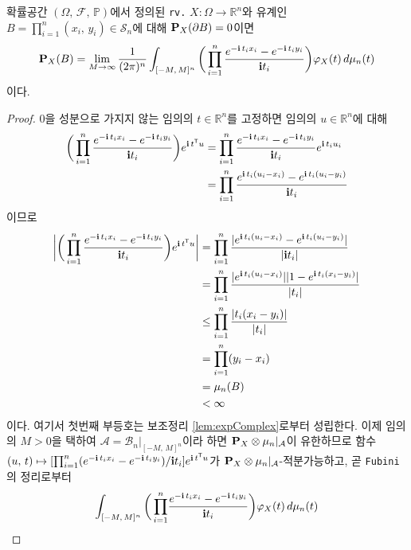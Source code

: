 \begin{theorem}
    확률공간 $(\Omega,\,\mathcal{F},\,\mathbb{P})$에서 정의된 \texttt{rv.} $X:\Omega\to\mathbb{R}^n$와 유계인 $B=\prod_{i=1}^n(x_i,\,y_i)\in\mathcal{S}_n$에 대해 $\mathbf{P}_X(\partial B)=0$이면
    \begin{equation*}
        \mathbf{P}_X(B)=\lim_{M\to\infty}\frac{1}{(2\pi)^n}\int_{[-M,\,M]^n}\bigg(\prod_{i=1}^n\frac{e^{-\mathbf{i}\,t_ix_i}-e^{-\mathbf{i}\,t_iy_i}}{\mathbf{i} t_i}\bigg)\varphi_X(t)\,d\mu_n(t)
    \end{equation*}
    이다.
\end{theorem}

\begin{proof}
    $0$을 성분으로 가지지 않는 임의의 $t\in\mathbb{R}^n$를 고정하면 임의의 $u\in\mathbb{R}^n$에 대해
    \begin{align*}
        \bigg(\prod_{i=1}^n\frac{e^{-\mathbf{i}\,t_ix_i}-e^{-\mathbf{i}\,t_iy_i}}{\mathbf{i} t_i}\bigg)e^{\mathbf{i}\,t^{\mathsf{T}} u}&=\prod_{i=1}^n\frac{e^{-\mathbf{i}\,t_ix_i}-e^{-\mathbf{i}\,t_iy_i}}{\mathbf{i} t_i}e^{\mathbf{i}\,t_iu_i}\\
        &=\prod_{i=1}^n\frac{e^{\mathbf{i}\,t_i(u_i-x_i)}-e^{\mathbf{i}\,t_i(u_i-y_i)}}{\mathbf{i} t_i}
    \end{align*}
    이므로
    \begin{align*}
        \bigg|\bigg(\prod_{i=1}^n\frac{e^{-\mathbf{i}\,t_ix_i}-e^{-\mathbf{i}\,t_iy_i}}{\mathbf{i} t_i}\bigg)e^{\mathbf{i}\,t^{\mathsf{T}} u}\bigg|&=\prod_{i=1}^n\frac{|e^{\mathbf{i}\,t_i(u_i-x_i)}-e^{\mathbf{i}\,t_i(u_i-y_i)}|}{|\mathbf{i} t_i|}\\
        &=\prod_{i=1}^n\frac{|e^{\mathbf{i}\,t_i(u_i-x_i)}||1-e^{\mathbf{i}\,t_i(x_i-y_i)}|}{|t_i|}\\
        &\leq\prod_{i=1}^n\frac{|t_i(x_i-y_i)|}{|t_i|}\\
        &=\prod_{i=1}^n(y_i-x_i)\\
        &=\mu_n(B)\\
        &<\infty
    \end{align*}
    이다. 여기서 첫번째 부등호는 보조정리 \ref{lem:expComplex}로부터 성립한다. 이제 임의의 $M>0$을 택하여 $\mathcal{A}=\mathcal{B}_n\vert_{[-M,\,M]^n}$이라 하면 $\mathbf{P}_X\otimes\mu_n\vert_\mathcal{A}$이 유한하므로 함수 $(u,\,t)\mapsto[\prod_{i=1}^n(e^{-\mathbf{i}\,t_ix_i}-e^{-\mathbf{i}\,t_iy_i})/\mathbf{i} t_i]e^{\mathbf{i}\,t^{\mathsf{T}} u}$가 $\mathbf{P}_X\otimes\mu_n\vert_\mathcal{A}$-적분가능하고, 곧 \texttt{Fubini}의 정리로부터
    \begin{align*}
        \int_{[-M,\,M]^n}\bigg(\prod_{i=1}^n&\frac{e^{-\imag\,t_ix_i}-e^{-\imag\,t_iy_i}}{\imag t_i}\bigg)\varphi_X(t)\,d\mu_n(t)\\

\end{align*}
\end{proof}

